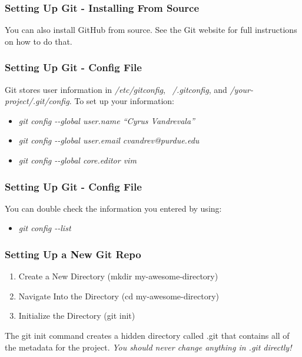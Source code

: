 \begin{frame}
\frametitle{\large{Setting Up Git - Installing From Source}}
You can also install GitHub from source. See the Git website for full instructions on how to do that.
\end{frame}

\begin{frame}
\frametitle{\large{Setting Up Git - Config File}}
Git stores user information in \emph{/etc/gitconfig}, \emph{~/.gitconfig}, and \emph{/your-project/.git/config}. To set up your information: \\
\begin{itemize}
\item \emph{git config -{}-global user.name ``Cyrus Vandrevala''}
\item \emph{git config -{}-global user.email cvandrev@purdue.edu}
\item \emph{git config -{}-global core.editor vim}
\end{itemize}
\end{frame}
\note{}

\begin{frame}
\frametitle{\large{Setting Up Git - Config File}}
You can double check the information you entered by using: \\
\begin{itemize}
\item \emph{git config -{}-list}
\end{itemize}
\end{frame}
\note{}

\begin{frame}
\frametitle{\large{Setting Up a New Git Repo}}
\begin{enumerate}
\item Create a New Directory (mkdir my-awesome-directory)
\item Navigate Into the Directory (cd my-awesome-directory)
\item Initialize the Directory (git init)
\end{enumerate}
\vspace{5mm}
The git init command creates a hidden directory called .git that contains all of the metadata for the project. \emph{You should never change anything in .git directly!}
\end{frame}
\note{}